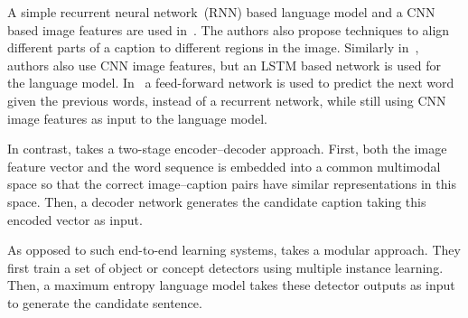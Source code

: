 A simple recurrent neural network~(RNN) based language model and a CNN based
image features are used in~\cite{Karpathy_2015_CVPR}. 
The authors also propose techniques to align different parts of a caption to
different regions in the image. 
Similarly in~\cite{Vinyals_2015_CVPR}, authors also use CNN image features, but
an LSTM based network is used for the language model.
In~\cite{kiros2014unifying}  a feed-forward network is used to predict the next
word given the previous words, instead of a recurrent network, while still using
CNN image features as input to the language model.

In contrast, \cite{kiros2014multimodal} takes a two-stage encoder--decoder
approach. 
First, both the image feature vector and the word sequence is embedded into a
common multimodal space so that the correct image--caption pairs have similar
representations in this space. 
Then, a decoder network generates the candidate caption taking this encoded
vector as input. 

As opposed to such end-to-end learning systems, \cite{Fang2015} takes a modular
approach. 
They first train a set of object or concept detectors using multiple instance
learning. 
Then, a maximum entropy language model takes these detector outputs as input to
generate the candidate sentence.

